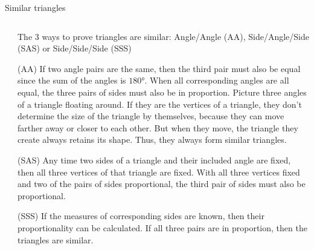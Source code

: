 \documentclass[9pt,aspectratio=169]{beamer}
\begin{document}
\begin{frame}{Similar triangles}
\begin{columns}[T]
\begin{column}{0.5\textwidth}
    \end{column}
    \begin{column}{0.5\textwidth}
      The 3 ways to prove triangles are similar: Angle/Angle (AA), Side/Angle/Side (SAS) or Side/Side/Side (SSS)

      \small
      (AA) If two angle pairs are the same, then the third pair must also be equal since the sum of the angles is $180°$. When all corresponding angles are all equal, the three pairs of sides must also be in proportion. Picture three angles of a triangle floating around. If they are the vertices of a triangle, they don't determine the size of the triangle by themselves, because they can move farther away or closer to each other. But when they move, the triangle they create always retains its shape. Thus, they always form similar triangles.

      (SAS) Any time two sides of a triangle and their included angle are fixed, then all three vertices of that triangle are fixed. With all three vertices fixed and two of the pairs of sides proportional, the third pair of sides must also be proportional.

      (SSS) If the measures of corresponding sides are known, then their proportionality can be calculated. If all three pairs are in proportion, then the triangles are similar.

    \end{column}
  \end{columns}
\end{frame}
\end{document}
